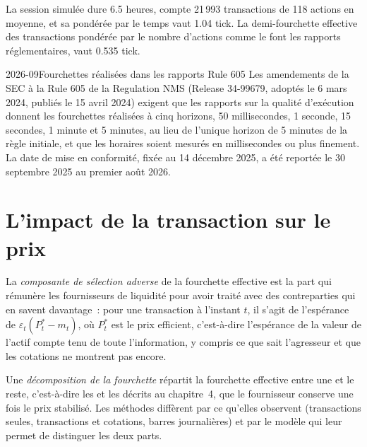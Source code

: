 La session simulée dure 6.5 heures, compte 21\,993 transactions de 118 actions en moyenne, et sa  pondérée par le temps vaut 1.04 tick. La demi-fourchette effective des transactions
pondérée par le nombre d'actions comme le font les rapports réglementaires, vaut 0.535 tick.

\begin{dated}{2026-09}{Fourchettes réalisées dans les rapports Rule 605}\label{dat:mx:decomposing-the-spread:rule605}
Les amendements de la SEC à la Rule 605 de la Regulation NMS (Release 34-99679, adoptés le 6 mars 2024, publiés le 15 avril 2024) exigent que les rapports sur la qualité d'exécution
donnent les fourchettes réalisées à cinq horizons, 50 millisecondes, 1 seconde, 15 secondes, 1 minute et 5 minutes, au lieu de l'unique
horizon de 5 minutes de la règle initiale, et que les horaires soient mesurés en millisecondes ou plus finement. La date de mise en conformité, fixée au 14 décembre 2025, a été reportée le
30 septembre 2025 au premier août 2026.
\end{dated}

\section{L'impact de la transaction sur le prix}

\begin{definition}\label{def:mx:decomposing-the-spread:adverse}
La \emph{composante de sélection adverse} de la fourchette effective est la part qui rémunère les fournisseurs de liquidité pour
avoir traité avec des contreparties qui en savent davantage~: pour une transaction à l'instant $t$, il s'agit de l'espérance de $\varepsilon_t(P^\ast_t-m_t)$, où $P^\ast_t$ est le prix efficient,
c'est-à-dire l'espérance de la valeur de l'actif compte tenu de toute l'information, y compris ce que sait l'agresseur et que les cotations ne montrent pas encore.
\end{definition}

\begin{definition}\label{def:mx:decomposing-the-spread:decomposition}
Une \emph{décomposition de la fourchette} répartit la fourchette effective entre une  et le reste, c'est-à-dire
les  et les  décrits au chapitre~4, que le fournisseur conserve une fois le prix stabilisé. Les méthodes diffèrent par ce qu'elles observent
(transactions seules, transactions et cotations, barres journalières) et par le modèle qui leur permet de distinguer les deux parts.
\end{definition}

